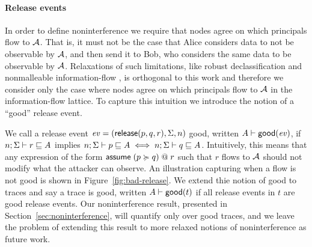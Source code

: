 \paragraph{Release events}\label{sec:release-event}
In order to define noninterference we require that nodes agree on which principals flow to $\mathcal{A}$. That is, it must not be the case that Alice considers data to not be observable by $\mathcal{A}$, and then send it to Bob, who considers the same data to be observable by $\mathcal{A}$. Relaxations of such limitations, like robust declassification \cite{???} and nonmalleable information-flow \cite{???}, is orthogonal to this work and therefore we consider only the case where nodes agree on which principals flow to $\mathcal{A}$ in the information-flow lattice. To capture this intuition we introduce the notion of a ``good'' release event.

We call a release event $\mathit{ev} = (\mathsf{release}(p, q, r), \Sigma, n)$ good, written $A \vdash \mathsf{good}(\mathit{ev})$, if $n; \Sigma \vdash r \sqsubseteq A$ implies $n; \Sigma \vdash p \sqsubseteq A \iff n; \Sigma \vdash q \sqsubseteq A$. Intuitively, this means that any expression of the form $\mathsf{assume}\;(p \succcurlyeq q) \;@ \; r$ such that $r$ flows to $\mathcal{A}$ should not modify what the attacker can observe. An illustration capturing when a flow is not good is shown in Figure~\ref{fig:bad-release}. We extend thie notion of good to traces and say a trace is good, written $A \vdash \mathsf{good}(t)$ if all release events in $t$ are good release events. Our noninterference result, presented in Section~\ref{sec:noninterference}, will quantify only over good traces, and we leave the problem of extending this result to more relaxed notions of noninterference as future work.

